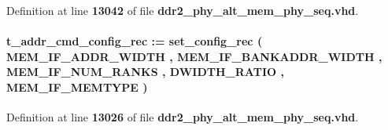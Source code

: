 Definition at line {\bf 13042} of file {\bf ddr2\+\_\+phy\+\_\+alt\+\_\+mem\+\_\+phy\+\_\+seq.\+vhd}.

\paragraph[{c\+\_\+seq\+\_\+addr\+\_\+cmd\+\_\+config}]{ {\bfseries \textcolor{vhdlchar}{t\+\_\+addr\+\_\+cmd\+\_\+config\+\_\+rec}\textcolor{vhdlchar}{ }\textcolor{vhdlchar}{ }\textcolor{vhdlchar}{\+:}\textcolor{vhdlchar}{=}\textcolor{vhdlchar}{ }\textcolor{vhdlchar}{ }\textcolor{vhdlchar}{ }\textcolor{vhdlchar}{ }\textcolor{vhdlchar}{set\+\_\+config\+\_\+rec}\textcolor{vhdlchar}{ }\textcolor{vhdlchar}{(}\textcolor{vhdlchar}{ }\textcolor{vhdlchar}{ }\textcolor{vhdlchar}{ }\textcolor{vhdlchar}{ }{\bfseries {\bf M\+E\+M\+\_\+\+I\+F\+\_\+\+A\+D\+D\+R\+\_\+\+W\+I\+D\+TH}} \textcolor{vhdlchar}{ }\textcolor{vhdlchar}{,}\textcolor{vhdlchar}{ }\textcolor{vhdlchar}{ }\textcolor{vhdlchar}{ }\textcolor{vhdlchar}{ }{\bfseries {\bf M\+E\+M\+\_\+\+I\+F\+\_\+\+B\+A\+N\+K\+A\+D\+D\+R\+\_\+\+W\+I\+D\+TH}} \textcolor{vhdlchar}{ }\textcolor{vhdlchar}{,}\textcolor{vhdlchar}{ }\textcolor{vhdlchar}{ }\textcolor{vhdlchar}{ }\textcolor{vhdlchar}{ }{\bfseries {\bf M\+E\+M\+\_\+\+I\+F\+\_\+\+N\+U\+M\+\_\+\+R\+A\+N\+KS}} \textcolor{vhdlchar}{ }\textcolor{vhdlchar}{,}\textcolor{vhdlchar}{ }\textcolor{vhdlchar}{ }\textcolor{vhdlchar}{ }\textcolor{vhdlchar}{ }{\bfseries {\bf D\+W\+I\+D\+T\+H\+\_\+\+R\+A\+T\+IO}} \textcolor{vhdlchar}{ }\textcolor{vhdlchar}{,}\textcolor{vhdlchar}{ }\textcolor{vhdlchar}{ }\textcolor{vhdlchar}{ }\textcolor{vhdlchar}{ }{\bfseries {\bf M\+E\+M\+\_\+\+I\+F\+\_\+\+M\+E\+M\+T\+Y\+PE}} \textcolor{vhdlchar}{ }\textcolor{vhdlchar}{)}\textcolor{vhdlchar}{ }} \hspace{0.3cm}{\ttfamily [Constant]}}\label{classddr2__phy__alt__mem__phy__seq_1_1struct_a87e441041cc5383db33bb3ee070d0267}


Definition at line {\bf 13026} of file {\bf ddr2\+\_\+phy\+\_\+alt\+\_\+mem\+\_\+phy\+\_\+seq.\+vhd}.

